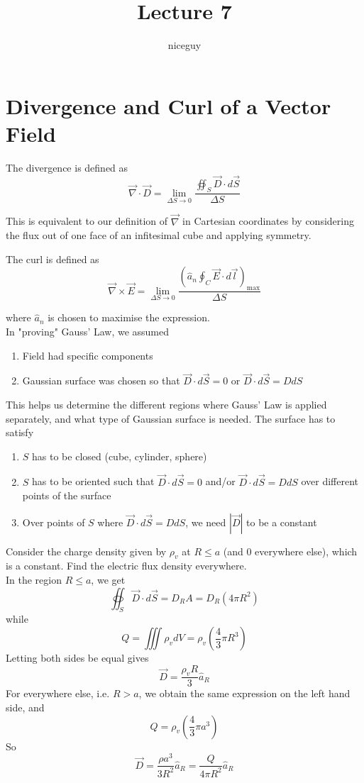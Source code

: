 \documentclass[12pt]{article}
\author{niceguy}
\title{Lecture 7}
\begin{document}
\maketitle

\section{Divergence and Curl of a Vector Field}

\begin{defn}
	The divergence is defined as
	$$\vec{\nabla}\cdot\vec{D} = \lim_{\Delta S\rightarrow0}\frac{\oiint_S\vec{D}\cdot d\vec{S}}{\Delta S}$$
\end{defn}

This is equivalent to our definition of $\vec{\nabla}$ in Cartesian coordinates by considering the flux out of one face of an infitesimal cube and applying symmetry.

\begin{defn}
	The curl is defined as
	$$\vec{\nabla}\times\vec{E} = \lim_{\Delta S\rightarrow0}\frac{\left(\hat{a}_n\oint_C\vec{E}\cdot d\vec{l}\right)_\mathrm{max}}{\Delta S}$$
\end{defn}

where $\hat{a}_n$ is chosen to maximise the expression. \\
In "proving" Gauss' Law, we assumed
\begin{enumerate}
	\item Field had specific components
	\item Gaussian surface was chosen so that $\vec{D}\cdot d\vec{S}=0$ or $\vec{D}\cdot d\vec{S} = DdS$
\end{enumerate}

This helps us determine the different regions where Gauss' Law is applied separately, and what type of Gaussian surface is needed. The surface has to satisfy

\begin{enumerate}
	\item $S$ has to be closed (cube, cylinder, sphere)
	\item $S$ has to be oriented such that $\vec{D}\cdot d\vec{S}=0$ and/or $\vec{D}\cdot d\vec{S}=DdS$ over different points of the surface
	\item Over points of $S$ where $\vec{D}\cdot d\vec{S} = DdS$, we need $|\vec{D}|$ to be a constant
\end{enumerate}

\begin{ex}
	Consider the charge density given by $\rho_v$ at $R\leq a$ (and 0 everywhere else), which is a constant. Find the electric flux density everywhere. \\
	In the region $R\leq a$, we get
	$$\oiint_S\vec{D}\cdot d\vec{S} = D_RA = D_R(4\pi R^2)$$
	while
	$$Q = \iiint \rho_v dV = \rho_v\left(\frac{4}{3}\pi R^3\right)$$
	Letting both sides be equal gives
	$$\vec{D} = \frac{\rho_vR}{3}\hat{a}_R$$
	For everywhere else, i.e. $R>a$, we obtain the same expression on the left hand side, and
	$$Q = \rho_v\left(\frac{4}{3}\pi a^3\right)$$
	So
	$$\vec{D} = \frac{\rho a^3}{3R^2}\hat{a}_R = \frac{Q}{4\pi R^2}\hat{a}_R$$
\end{ex}
\end{document}
